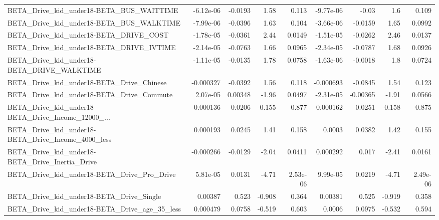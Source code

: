 \begin{tabular}{lrrrrrrrr}
BETA\_Drive\_kid\_under18-BETA\_BUS\_WAITTIME           &   -6.12e-06 &      -0.0193 &     1.58 &    0.113 &  -9.77e-06 &       -0.03 &          1.6 &         0.109 \\
BETA\_Drive\_kid\_under18-BETA\_BUS\_WALKTIME           &   -7.99e-06 &      -0.0396 &     1.63 &    0.104 &  -3.66e-06 &     -0.0159 &         1.65 &        0.0992 \\
BETA\_Drive\_kid\_under18-BETA\_DRIVE\_COST             &   -1.78e-05 &      -0.0361 &     2.44 &   0.0149 &  -1.51e-05 &     -0.0262 &         2.46 &        0.0137 \\
BETA\_Drive\_kid\_under18-BETA\_DRIVE\_IVTIME           &   -2.14e-05 &      -0.0763 &     1.66 &   0.0965 &  -2.34e-05 &     -0.0787 &         1.68 &        0.0926 \\
BETA\_Drive\_kid\_under18-BETA\_DRIVE\_WALKTIME         &   -1.11e-05 &      -0.0135 &     1.78 &   0.0758 &  -1.63e-06 &     -0.0018 &          1.8 &        0.0724 \\
BETA\_Drive\_kid\_under18-BETA\_Drive\_Chinese          &   -0.000327 &      -0.0392 &     1.56 &    0.118 &  -0.000693 &     -0.0845 &         1.54 &         0.123 \\
BETA\_Drive\_kid\_under18-BETA\_Drive\_Commute          &    2.07e-05 &      0.00348 &    -1.96 &   0.0497 &  -2.31e-05 &    -0.00365 &        -1.91 &        0.0566 \\
BETA\_Drive\_kid\_under18-BETA\_Drive\_Income\_12000\_... &    0.000136 &       0.0206 &   -0.155 &    0.877 &   0.000162 &      0.0251 &       -0.158 &         0.875 \\
BETA\_Drive\_kid\_under18-BETA\_Drive\_Income\_4000\_less &    0.000193 &       0.0245 &     1.41 &    0.158 &     0.0003 &      0.0382 &         1.42 &         0.155 \\
BETA\_Drive\_kid\_under18-BETA\_Drive\_Inertia\_Drive    &   -0.000266 &      -0.0129 &    -2.04 &   0.0411 &   0.000292 &       0.017 &        -2.41 &        0.0161 \\
BETA\_Drive\_kid\_under18-BETA\_Drive\_Pro\_Drive        &    5.81e-05 &       0.0131 &    -4.71 & 2.53e-06 &   9.99e-05 &      0.0219 &        -4.71 &      2.49e-06 \\
BETA\_Drive\_kid\_under18-BETA\_Drive\_Single           &     0.00387 &        0.523 &   -0.908 &    0.364 &    0.00381 &       0.525 &       -0.919 &         0.358 \\
BETA\_Drive\_kid\_under18-BETA\_Drive\_age\_35\_less      &    0.000479 &       0.0758 &   -0.519 &    0.603 &     0.0006 &      0.0975 &       -0.532 &         0.594 \\

\end{tabular}
